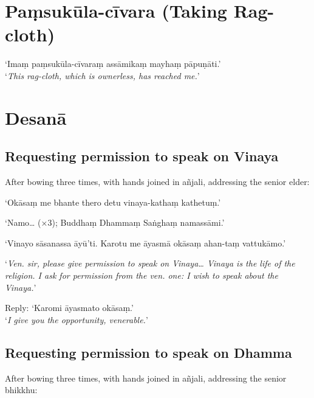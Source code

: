 \section{Paṃsukūla-cīvara (Taking Rag-cloth)}

‘Imaṃ paṃsukūla-cīvaraṃ assāmikaṃ mayhaṃ pāpuṇāti.’\\
‘\emph{This rag-cloth, which is ownerless, has reached me.}’

\ifhandbookedition
\clearpage
\fi

\section{Desanā}

\subsection[Permission to speak on Vinaya]{Requesting permission to speak on Vinaya}

\vspace*{-0.5\baselineskip}

\begin{instruction}
  After bowing three times, with hands joined in añjali, addressing the senior
  elder:
\end{instruction}

‘Okāsaṃ me bhante thero detu vinaya-kathaṃ kathetuṃ.’

‘Namo… (×3); Buddhaṃ Dhammaṃ Saṅghaṃ namassāmi.’

‘Vinayo sāsanassa āyū'ti. Karotu me āyasmā okāsaṃ ahan-taṃ vattukāmo.’

‘\emph{Ven. sir, please give permission to speak on Vinaya… Vinaya is the life
  of the religion. I ask for permission from the ven. one: I wish to speak about
  the Vinaya.}’

Reply: ‘Karomi āyasmato okāsaṃ.’\\
‘\emph{I give you the opportunity, venerable.}’ 

\subsection[Permission to speak on Dhamma]{Requesting permission to speak on Dhamma}

\vspace*{-0.5\baselineskip}

\begin{instruction}
  After bowing three times, with hands joined in añjali, addressing the senior
  bhikkhu:
\end{instruction}

